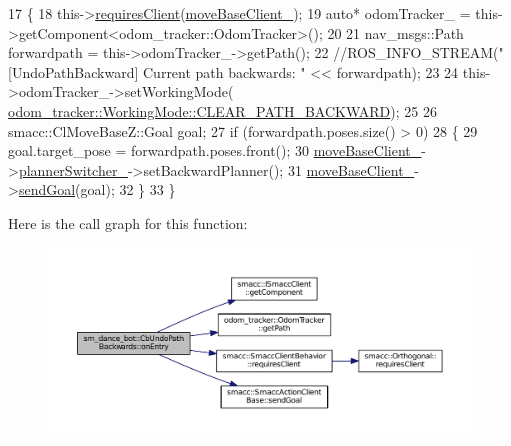 \begin{DoxyCode}
17   \{
18     this->\hyperlink{classsmacc_1_1SmaccClientBehavior_a917f001e763a1059af337bf4e164f542}{requiresClient}(\hyperlink{classsm__dance__bot_1_1CbUndoPathBackwards_a2e134a879373ea9d29d04f72f707cbc8}{moveBaseClient\_});
19     \textcolor{keyword}{auto}* odomTracker\_ = this->getComponent<odom\_tracker::OdomTracker>();
20 
21     nav\_msgs::Path forwardpath = this->odomTracker\_->getPath();
22     \textcolor{comment}{//ROS\_INFO\_STREAM("[UndoPathBackward] Current path backwards: " << forwardpath);}
23 
24     this->odomTracker\_->setWorkingMode(
      \hyperlink{namespaceodom__tracker_a4daf27fd157b1a481fdfd6f90de00b88a0cf8f27617189e35619df3c18bda6274}{odom\_tracker::WorkingMode::CLEAR\_PATH\_BACKWARD});
25 
26     smacc::ClMoveBaseZ::Goal goal;
27     \textcolor{keywordflow}{if} (forwardpath.poses.size() > 0)
28     \{
29       goal.target\_pose = forwardpath.poses.front();
30       \hyperlink{classsm__dance__bot_1_1CbUndoPathBackwards_a2e134a879373ea9d29d04f72f707cbc8}{moveBaseClient\_}->\hyperlink{classsmacc_1_1ClMoveBaseZ_a712e0df77c9629930e03cbb4c539b485}{plannerSwitcher\_}->setBackwardPlanner();
31       \hyperlink{classsm__dance__bot_1_1CbUndoPathBackwards_a2e134a879373ea9d29d04f72f707cbc8}{moveBaseClient\_}->\hyperlink{classsmacc_1_1SmaccActionClientBase_a58c67a87c5fb8ea1633573c58fe3eee1}{sendGoal}(goal);
32     \}
33   \}
\end{DoxyCode}


Here is the call graph for this function\+:
\nopagebreak
\begin{figure}[H]
\begin{center}
\leavevmode
\includegraphics[width=350pt]{classsm__dance__bot_1_1CbUndoPathBackwards_a5ecdf83df96ab3d74eb4e4febea7fa74_cgraph}
\end{center}
\end{figure}



